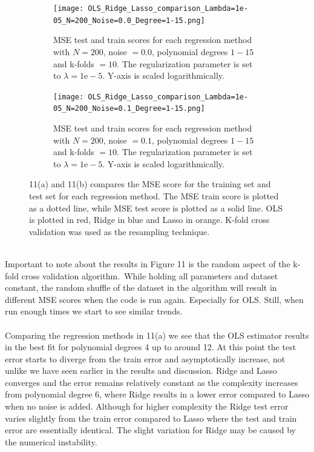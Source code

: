 \documentclass[a4paper,twocolumn]{article}
\begin{document}
\begin{figure}[ht]
    \centering
    \begin{subfigure}[b]{0.9\columnwidth}
        \texttt{[image: OLS\_Ridge\_Lasso\_comparison\_Lambda=1e-05\_N=200\_Noise=0.0\_Degree=1-15.png]}
        \caption{MSE test and train scores for each regression method with $N = 200$, noise $= 0.0$, polynomial degrees $1- 15$ and k-folds $= 10$. The regularization parameter is set to $\lambda = 1\textrm{e}-5$. Y-axis is scaled logarithmically.}
    \end{subfigure}
    
    \begin{subfigure}[b]{0.9\columnwidth}
        \texttt{[image: OLS\_Ridge\_Lasso\_comparison\_Lambda=1e-05\_N=200\_Noise=0.1\_Degree=1-15.png]}
        \caption{MSE test and train scores for each regression method with $N = 200$, noise $= 0.1$, polynomial degrees $1- 15$ and k-folds $= 10$. The regularization parameter is set to $\lambda = 1\textrm{e}-5$. Y-axis is scaled logarithmically.}
    \end{subfigure}
    \caption{11(a) and 11(b) compares the MSE score for the training set and test set for each regression method. The MSE train score is plotted as a dotted line, while MSE test score is plotted as a solid line. OLS is plotted in red, Ridge in blue and Lasso in orange. K-fold cross validation was used as the resampling technique.}
\end{figure}\\
Important to note about the results in Figure 11 is the random aspect of the k-fold cross validation algorithm.\ While holding all parameters and dataset constant, the random shuffle of the dataset in the algorithm will result in different MSE scores when the code is run again. Especially for OLS. Still, when run enough times we start to see similar trends.\\
\\
Comparing the regression methods in 11(a) we see that the OLS estimator results in the best fit for polynomial degrees 4 up to around 12. At this point the test error starts to diverge from the train error and asymptotically increase, not unlike we have seen earlier in the results and discussion. Ridge and Lasso converges and the error remains relatively constant as the complexity increases from polynomial degree 6, where Ridge results in a lower error compared to Lasso when no noise is added. Although for higher complexity the Ridge test error varies slightly from the train error compared to Lasso where the test and train error are essentially identical. The slight variation for Ridge may be caused by the numerical instability. \\
\end{document}
